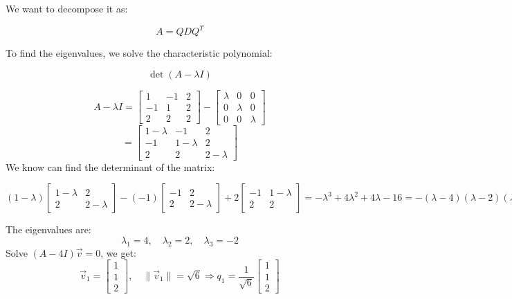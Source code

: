 \documentclass[12pt]{article}
\begin{document}
\begin{enumerate}[leftmargin=0em]
    We want to decompose it as:
    
    \[
    A = Q D Q^T
    \]
    
    To find the eigenvalues, we solve the characteristic polynomial:
    
    \[\det(A - \lambda I) \]
    
    \[ A - \lambda I = \begin{bmatrix}
    1 & -1 & 2 \\
    -1 & 1 & 2 \\
    2 & 2 & 2
    \end{bmatrix}
    -
    \begin{bmatrix}
        \lambda & 0 & 0 \\
        0 & \lambda & 0 \\
        0 & 0 & \lambda
    \end{bmatrix}
    \]
    \[
    = \begin{bmatrix}
        1 - \lambda & -1 & 2 \\
        -1 & 1-\lambda & 2 \\
        2 & 2 & 2-\lambda
    \end{bmatrix}
    \]
    We know can find the determinant of the matrix:
    
    \[(1-\lambda)
    \begin{bmatrix}
    1-\lambda & 2 \\
    2 & 2-\lambda
    \end{bmatrix}
    -(-1)
    \begin{bmatrix}
        -1 & 2 \\
        2 & 2-\lambda
    \end{bmatrix}
    +2 \begin{bmatrix}
        -1 & 1-\lambda \\
        2 & 2
    \end{bmatrix} 
    = 
    -\lambda^{3} + 4\lambda^{2}+4\lambda-16 = -(\lambda - 4)(\lambda - 2)(\lambda + 2)
    \]
    
    The eigenvalues are:
    \[
    \lambda_1 = 4, \quad \lambda_2 = 2, \quad \lambda_3 = -2
    \]
    Solve \( (A - 4I)\vec{v} = 0 \), we get:
    \[
    \vec{v}_1 = \begin{bmatrix} 1 \\ 1 \\ 2 \end{bmatrix}, \quad
    \|\vec{v}_1\| = \sqrt{6}
    \Rightarrow
    q_1 = \frac{1}{\sqrt{6}} \begin{bmatrix} 1 \\ 1 \\ 2 \end{bmatrix}
    \]
    

\end{enumerate}
\end{document}

